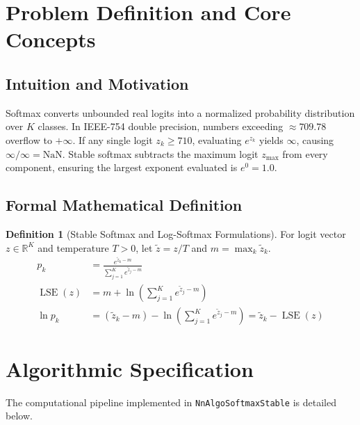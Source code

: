 \documentclass[11pt,a4paper]{article}
\theoremstyle{definition}
\newtheorem{definition}{Definition}[section]
\begin{document}
\section{Problem Definition and Core Concepts}

\subsection{Intuition and Motivation}
Softmax converts unbounded real logits into a normalized probability distribution over $K$ classes. In IEEE-754 double precision, numbers exceeding $\approx 709.78$ overflow to $+\infty$. If any single logit $z_k \ge 710$, evaluating $e^{z_k}$ yields $\infty$, causing $\infty / \infty = \text{NaN}$. Stable softmax subtracts the maximum logit $z_{\max}$ from every component, ensuring the largest exponent evaluated is $e^0 = 1.0$.

\subsection{Formal Mathematical Definition}
\begin{definition}[Stable Softmax and Log-Softmax Formulations]
For logit vector $z \in \mathbb{R}^K$ and temperature $T > 0$, let $\tilde{z} = z / T$ and $m = \max_{k} \tilde{z}_k$.
\begin{align}
p_k &= \frac{e^{\tilde{z}_k - m}}{\sum_{j=1}^K e^{\tilde{z}_j - m}} \label{eq:stable_softmax} \\
\operatorname{LSE}(z) &= m + \ln\left( \sum_{j=1}^K e^{\tilde{z}_j - m} \right) \label{eq:lse_formula} \\
\ln p_k &= (\tilde{z}_k - m) - \ln\left( \sum_{j=1}^K e^{\tilde{z}_j - m} \right) = \tilde{z}_k - \operatorname{LSE}(z) \label{eq:log_softmax}
\end{align}
\end{definition}

\section{Algorithmic Specification}

The computational pipeline implemented in \texttt{NnAlgoSoftmaxStable} is detailed below.
\end{document}
